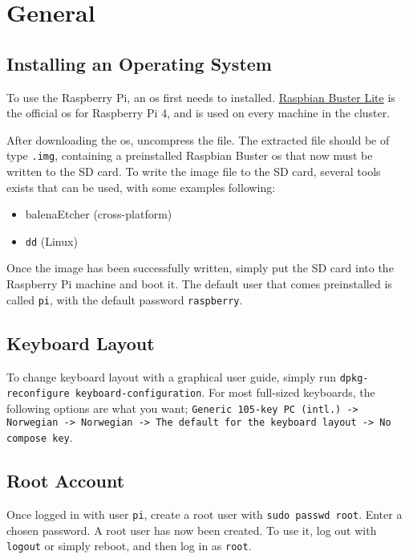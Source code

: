 \chapter{General}

\section{Installing an Operating System} \label{install_os}

To use the Raspberry Pi, an \gls{os} first needs to installed. \href{https://www.raspberrypi.org/downloads/raspbian/}{Raspbian Buster Lite} is the official \gls{os} for Raspberry Pi 4, and is used on every machine in the cluster.


After downloading the \gls{os}, uncompress the file. The extracted file should be of type \lstinline{.img}, containing a preinstalled Raspbian Buster \gls{os} that now must be written to the SD card. To write the image file to the SD card, several tools exists that can be used, with some examples following:

\begin{itemize}
    \item balenaEtcher (cross-platform)
    \item \lstinline{dd} (Linux)
\end{itemize}

Once the image has been successfully written, simply put the SD card into the Raspberry Pi machine and boot it. The default user that comes preinstalled is called \lstinline{pi}, with the default password \lstinline{raspberry}.


\section{Keyboard Layout} \label{keyboard_layout}

To change keyboard layout with a graphical user guide, simply run \lstinline{dpkg-reconfigure keyboard-configuration}. For most full-sized keyboards, the following options are what you want; \lstinline{Generic 105-key PC (intl.) -> Norwegian -> Norwegian -> The default for the keyboard layout -> No compose key}.


\section{Root Account} \label{root_account}

Once logged in with user \lstinline{pi}, create a root user with \lstinline{sudo passwd root}. Enter a chosen password. A root user has now been created. To use it, log out with \lstinline{logout} or simply reboot, and then log in as \lstinline{root}.

